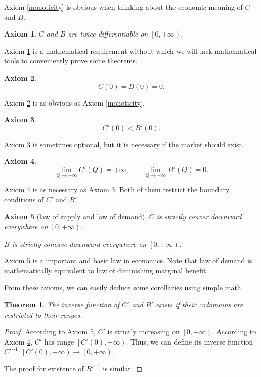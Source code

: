 \documentclass{article}
\newtheorem{axiom}{Axiom}
\newtheorem{theorem}{Theorem}
\begin{document}
Axiom \ref{monoticity} is obvious when thinking about the economic meaning of $C$ and $B$.

\begin{axiom}
\label{smoothness}
$C$ and $B$ are twice differentiable on $\left[0,+\infty\right)$.
\end{axiom}

Axiom \ref{smoothness} is a mathematical requirement
without which we will lack mathematical tools to conveniently prove some theorems.

\begin{axiom}
\label{initial cost and benefit}
$$C\left(0\right)=B\left(0\right)=0.$$
\end{axiom}

Axiom \ref{initial cost and benefit} is as obvious as Axiom \ref{monoticity}.

\begin{axiom}
\label{initial supply and demand}
$$C'\left(0\right)<B'\left(0\right).$$
\end{axiom}

Axiom \ref{initial supply and demand} is sometimes optional,
but it is necessary if the market should exist.

\begin{axiom}
\label{inf}
$$\lim_{Q\to+\infty}C'\left(Q\right)=+\infty,
\qquad\lim_{Q\to+\infty}B'\left(Q\right)=0.$$
\end{axiom}

Axiom \ref{inf} is as necessary as Axiom \ref{initial supply and demand}.
Both of them restrict the boundary conditions of $C'$ and $B'$.

\begin{axiom}[law of supply and law of demand]
\label{law of supply and demand}
$C$ is strictly convex downward everywhere on $\left[0,+\infty\right)$.

$B$ is strictly concave downward everywhere on $\left[0,+\infty\right)$.
\end{axiom}

Axiom \ref{law of supply and demand} is a important and basic law in economics.
Note that law of demand is mathematically equivalent to law of diminishing marginal benefit.

From these axioms, we can easily deduce some corollaries using simple math.

\begin{theorem}
The inverse function of $C'$ and $B'$ exists if their codomains are restricted to their ranges.
\end{theorem}
\begin{proof}
According to Axiom \ref{law of supply and demand}, $C'$ is strictly increasing on $\left[0,+\infty\right)$.
According to Axiom \ref{inf}, $C'$ has range $\left[C'\left(0\right),+\infty\right)$.
Thus, we can define its inverse function $C'^{-1}:\left[C'\left(0\right),+\infty\right)\to\left[0,+\infty\right)$.

The proof for existence of $B'^{-1}$ is similar.
\end{proof}
\end{document}
